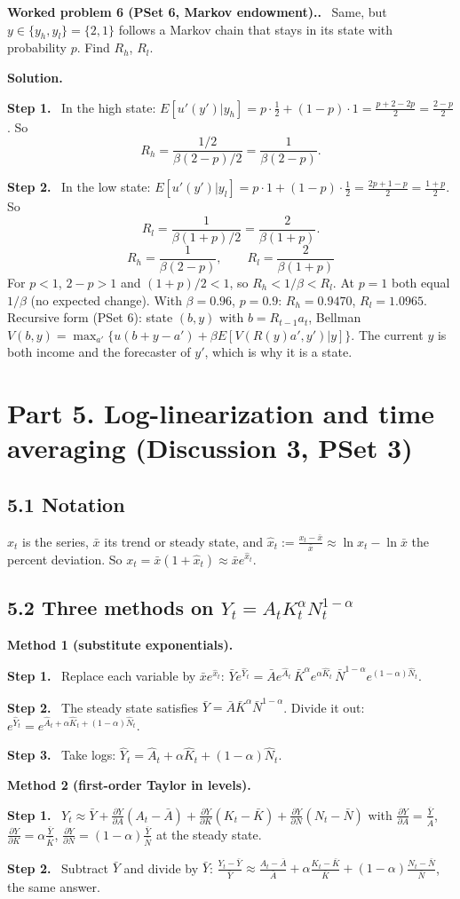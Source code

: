 \documentclass[12pt]{article}
\newcommand{\st}[1]{\par\smallskip\textbf{Step #1.}\ }
\newcommand{\ans}[1]{\[\boxed{\ #1\ }\]}
\newcommand{\prob}[1]{\par\bigskip\textbf{Worked problem #1.}\ }
\newcommand{\sol}{\par\smallskip\textbf{Solution.}\par}
\begin{document}
\prob{6 (PSet 6, Markov endowment).} Same, but $y\in\{y_h,y_l\}=\{2,1\}$
follows a Markov chain that stays in its state with probability $p$. Find $R_h$, $R_l$.
\sol
\st{1} In the high state: $E[u'(y')|y_h]=p\cdot\frac12+(1-p)\cdot1=\frac{p+2-2p}{2}=\frac{2-p}{2}$. So
\[
R_h=\frac{1/2}{\beta(2-p)/2}=\frac{1}{\beta(2-p)} .
\]
\st{2} In the low state: $E[u'(y')|y_l]=p\cdot1+(1-p)\cdot\frac12=\frac{2p+1-p}{2}=\frac{1+p}{2}$. So
\[
R_l=\frac{1}{\beta(1+p)/2}=\frac{2}{\beta(1+p)} .
\]
\ans{R_h=\frac{1}{\beta(2-p)},\qquad R_l=\frac{2}{\beta(1+p)}}
For $p<1$, $2-p>1$ and $(1+p)/2<1$, so $R_h<1/\beta<R_l$. At $p=1$ both equal
$1/\beta$ (no expected change). With $\beta=0.96$, $p=0.9$: $R_h=0.9470$, $R_l=1.0965$.
Recursive form (PSet 6): state $(b,y)$ with $b=R_{t-1}a_t$, Bellman
$V(b,y)=\max_{a'}\{u(b+y-a')+\beta E[V(R(y)a',y')|y]\}$. The current $y$ is both
income and the forecaster of $y'$, which is why it is a state.

\section*{Part 5. Log-linearization and time averaging (Discussion 3, PSet 3)}

\subsection*{5.1 Notation}
$x_t$ is the series, $\bar x$ its trend or steady state, and
$\hat x_t:=\frac{x_t-\bar x}{\bar x}\approx\ln x_t-\ln\bar x$ the percent
deviation. So $x_t=\bar x(1+\hat x_t)\approx\bar xe^{\hat x_t}$.

\subsection*{5.2 Three methods on $Y_t=A_tK_t^\alpha N_t^{1-\alpha}$}
\textbf{Method 1 (substitute exponentials).}
\st{1} Replace each variable by $\bar xe^{\hat x_t}$:
$\bar Ye^{\hat Y_t}=\bar Ae^{\hat A_t}\,\bar K^\alpha e^{\alpha\hat K_t}\,\bar N^{1-\alpha}e^{(1-\alpha)\hat N_t}$.
\st{2} The steady state satisfies $\bar Y=\bar A\bar K^\alpha\bar N^{1-\alpha}$. Divide it out:
$e^{\hat Y_t}=e^{\hat A_t+\alpha\hat K_t+(1-\alpha)\hat N_t}$.
\st{3} Take logs: $\hat Y_t=\hat A_t+\alpha\hat K_t+(1-\alpha)\hat N_t$.

\textbf{Method 2 (first-order Taylor in levels).}
\st{1} $Y_t\approx\bar Y+\frac{\partial Y}{\partial A}(A_t-\bar A)+\frac{\partial Y}{\partial K}(K_t-\bar K)+\frac{\partial Y}{\partial N}(N_t-\bar N)$
with $\frac{\partial Y}{\partial A}=\frac{\bar Y}{\bar A}$, $\frac{\partial Y}{\partial K}=\alpha\frac{\bar Y}{\bar K}$, $\frac{\partial Y}{\partial N}=(1-\alpha)\frac{\bar Y}{\bar N}$ at the steady state.
\st{2} Subtract $\bar Y$ and divide by $\bar Y$:
$\frac{Y_t-\bar Y}{\bar Y}\approx\frac{A_t-\bar A}{\bar A}+\alpha\frac{K_t-\bar K}{\bar K}+(1-\alpha)\frac{N_t-\bar N}{\bar N}$, the same answer.
\end{document}
